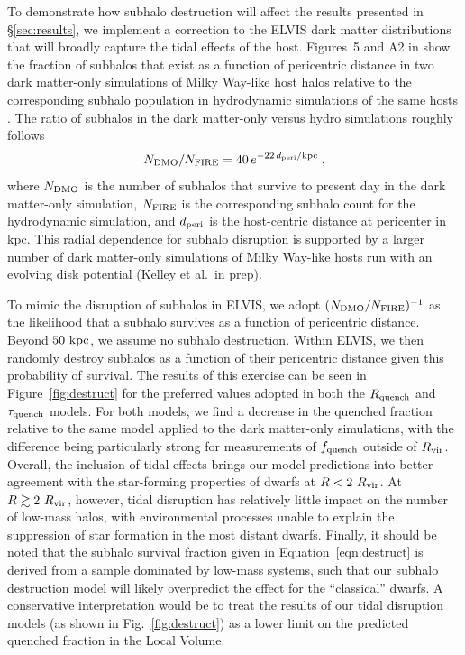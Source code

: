 \documentclass[usenatbib]{mnras}
\newcommand{\rvir}{R_{\rm vir}}
\begin{document}
To demonstrate how subhalo destruction will affect the results presented in
\S\ref{sec:results}, we implement a correction to the ELVIS dark matter
distributions that will broadly capture the tidal effects of the host.
%
Figures~5 and A2 in \citet{gk17} show the fraction of subhalos that exist as a
function of pericentric distance in two dark matter-only simulations of Milky
Way-like host halos relative to the corresponding subhalo population in
hydrodynamic simulations of the same hosts \citep[using the FIRE model for star
formation and feedback,][]{wetzel16, hopkins14, hopkins17}.
%
The ratio of subhalos in the dark matter-only versus hydro simulations roughly
follows
%
\begin{equation}
  N_{\rm DMO} / N_{\rm FIRE} =  40 \, e^{-22 \, d_{\rm peri}/{\rm kpc}} \; ,
\label{eqn:destruct}
\end{equation}
%
where $N_ {\rm DMO}$ is the number of subhalos that survive to present day in
the dark matter-only simulation, $N_ {\rm FIRE}$ is the corresponding subhalo
count for the hydrodynamic simulation, and $d_{\rm peri}$ is the host-centric
distance at pericenter in kpc.
%
This radial dependence for subhalo disruption is supported by a larger number of
dark matter-only simulations of Milky Way-like hosts run with an evolving disk
potential (Kelley et al.~in prep).


To mimic the disruption of subhalos in ELVIS, we adopt $(N_{\rm DMO}/N_{\rm
  FIRE})^{-1}$ as the likelihood that a subhalo survives as a function of
pericentric distance.
%
Beyond $50~{\rm kpc}$, we assume no subhalo destruction.
%
Within ELVIS, we then randomly destroy subhalos as a function of their
pericentric distance given this probability of survival.
%
The results of this exercise can be seen in Figure~\ref{fig:destruct} for the
preferred values adopted in both the $R_{\rm quench}$ and $\tau_{\rm quench}$
models. For both models, we find a decrease in the quenched fraction relative to
the same model applied to the dark matter-only simulations, with the difference
being particularly strong for measurements of $f_{\rm quench}$ outside of
$\rvir$.
%
Overall, the inclusion of tidal effects brings our model predictions into better
agreement with the star-forming properties of dwarfs at $R < 2~\rvir$. 
%
At $R \gtrsim 2~\rvir$, however, tidal disruption has relatively little impact on the
number of low-mass halos, with environmental processes unable to explain the
suppression of star formation in the most distant dwarfs. 
%
Finally, it should be noted that the subhalo survival fraction given in
Equation~\ref{eqn:destruct} is derived from a sample dominated by low-mass
systems, such that our subhalo destruction model will likely overpredict the
effect for the ``classical'' dwarfs. A conservative interpretation would be to
treat the results of our tidal disruption models (as shown in
Fig.~\ref{fig:destruct}) as a lower limit on the predicted quenched fraction in
the Local Volume.
\end{document}
